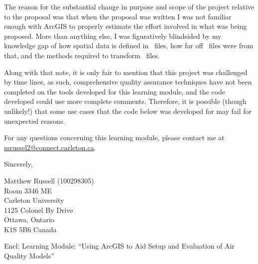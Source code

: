 The reason for the substantial change in purpose and scope of the
project relative to the proposal was that when the proposal was
written I was not familiar enough with ArcGIS to properly estimate the
effort involved in what was being proposed.  More than anything else,
I was figuratively blindsided by my knowledge gap of how spatial data
is defined in \netcdf~files, how far off \ioapi~files were from that,
and the methods required to transform \ioapi~files.

Along with that note, it is only fair to mention that this project was
challenged by time lines, as such, comprehensive quality assurance
techniques have not been completed on the tools developed for this
learning module, and the code developed could use more complete
comments.  Therefore, it is possible (though unlikely!) that some use
cases that the code below was developed for may fail for unexpected
reasons.

For any questions concerning this learning module, please contact me at 
\href{mailto:mrussel2@connect.carleton.ca}{mrussel2@connect.carleton.ca}.

\vspace{10mm}
\noindent Sincerely,

\vspace{15mm}
\noindent Matthew Russell (100298305) \\
Room 3346 ME\\
Carleton University\\
1125 Colonel By Drive\\
Ottawa, Ontario\\
K1S 5B6 Canada\\
\vspace{5mm}

\noindent Encl: Learning Module: ``Using ArcGIS to Aid Setup and Evaluation of Air Quality Models''


